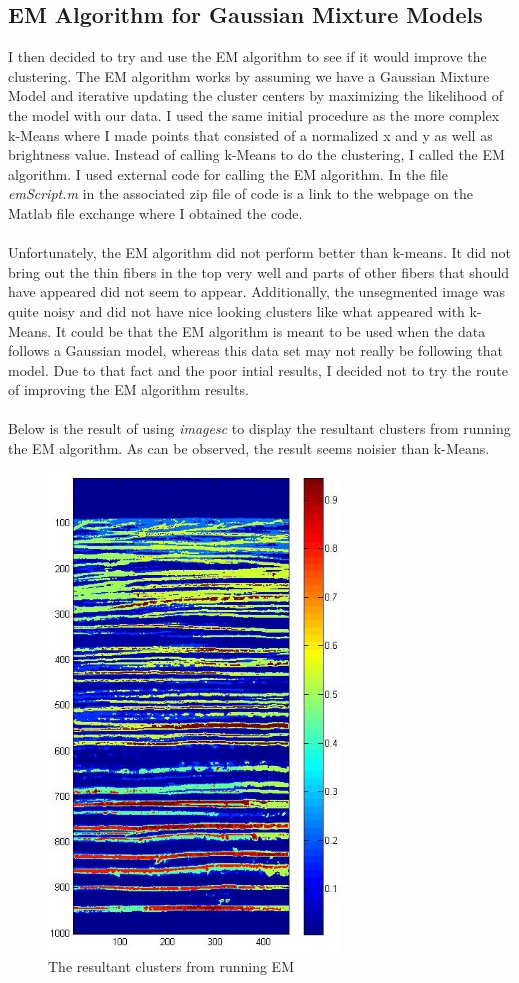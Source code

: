 \documentclass[11pt,psfig]{article}
\begin{document}
\subsection{EM Algorithm for Gaussian Mixture Models}
I then decided to try and use the EM algorithm to see if it would improve the clustering. The EM algorithm works by assuming we have a Gaussian Mixture Model and iterative updating the cluster centers by maximizing the likelihood of the model with our data. I used the same initial procedure as the more complex k-Means where I made points that consisted of a normalized x and y as well as brightness value. Instead of calling k-Means to do the clustering, I called the EM algorithm. I used external code for calling the EM algorithm. In the file \textit{emScript.m} in the associated zip file of code is a link to the webpage on the Matlab file exchange where I obtained the code. \\
\\
Unfortunately, the EM algorithm did not perform better than k-means. It did not bring out the thin fibers in the top very well and parts of other fibers that should have appeared did not seem to appear. Additionally, the unsegmented image was quite noisy and did not have nice looking clusters like what appeared with k-Means. It could be that the EM algorithm is meant to be used when the data follows a Gaussian model, whereas this data set may not really be following that model. Due to that fact and the poor intial results, I decided not to try the route of improving the EM algorithm results. \\
\\
Below is the result of using \textit{imagesc} to display the resultant clusters from running the EM algorithm. As can be observed, the result seems noisier than k-Means.
\begin{figure}[H]
\centering
\includegraphics[height=5in]{emResultUnsegmented.jpg}
\caption{The resultant clusters from running EM}
\end{figure}
\end{document}

